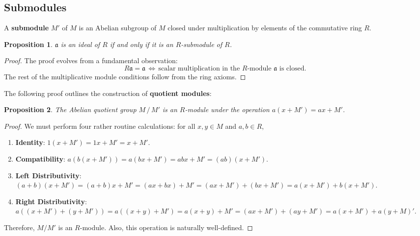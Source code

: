 \documentclass[11pt]{article}
\newtheorem{proposition}{Proposition}
\begin{document}

\subsection{Submodules}

A \textbf{submodule} $M'$ of $M$ is an Abelian subgroup of $M$ closed under multiplication by elements of the commutative ring $R$. 

\begin{adjustwidth}{0.5cm}{}
  \begin{proposition}
    $\mathfrak{a}$ is an ideal of $R$ if and only if it is an $R$-submodule of $R$.
  \end{proposition}
  \begin{proof}
    The proof evolves from a fundamental observation:
    \[
      R \mathfrak{a} = \mathfrak{a} \, \iff \, \text{scalar multiplication in the $R$-module $\mathfrak{a}$ is closed}.
    \]
    The rest of the multiplicative module conditions follow from the ring axioms.
  \end{proof}
\end{adjustwidth}

The following proof outlines the construction of \textbf{quotient modules}:

\begin{adjustwidth}{0.5cm}{}
	\begin{proposition}
		The Abelian quotient group $M \, / \, M'$ is an $R$-module under the operation $a(x + M') = ax + M'$.
	\end{proposition}
	\begin{proof}
		We must perform four rather routine calculations: for all $x, y \in M$ and $a, b \in R$,
		\begin{enumerate}
      \item \textbf{Identity}: $1(x + M') = 1x + M' = x + M'$.
      \item \textbf{Compatibility}: $a(b(x + M')) = a(bx + M') = abx + M' = (ab)(x + M')$.
			\item \textbf{Left Distributivity}: $(a + b)(x + M') = (a + b)x + M' = (ax + bx) + M' = (ax + M') + (bx + M') = a(x + M') + b(x + M')$.
			\item \textbf{Right Distributivity}: $a((x + M') + (y + M')) = a((x + y) + M') = a(x + y) + M' = (ax + M') + (ay + M') = a(x + M') + a(y + M)'$.
		\end{enumerate}
		Therefore, $M / M'$ is an $R$-module. Also, this operation is naturally well-defined.
	\end{proof}
\end{adjustwidth}
\end{document}
